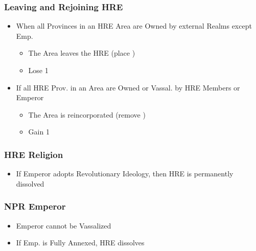 \documentclass[10pt]{article}
\begin{document}
\subsubsection*{Leaving and Rejoining HRE }
\begin{itemize}
	\item When all Provinces in an HRE Area are Owned by external Realms except Emp.
	\begin{itemize}
		\item The Area leaves the HRE (place \nothre)
		\item Lose 1\authority
	\end{itemize}
	\item If all HRE Prov. in an Area are Owned or Vassal. by HRE Members or Emperor
	\begin{itemize}
		\item The Area is reincorporated (remove \nothre)
		\item Gain 1\authority
	\end{itemize}
\end{itemize}

\subsubsection*{HRE Religion }
\begin{itemize}
	\item If Emperor adopts Revolutionary Ideology, then HRE is permanently dissolved
\end{itemize}

\subsubsection*{NPR Emperor }
\begin{itemize}
	\item Emperor cannot be Vassalized
	\item If Emp. is Fully Annexed, HRE dissolves
\end{itemize}
\end{document}
